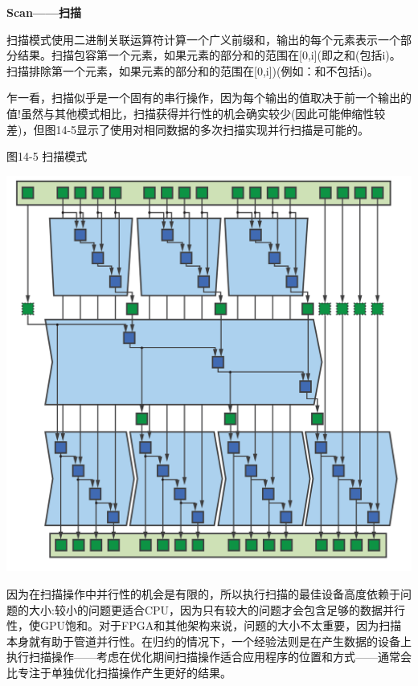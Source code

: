 \hspace*{\fill} \par %
\textbf{Scan——扫描}

扫描模式使用二进制关联运算符计算一个广义前缀和，输出的每个元素表示一个部分结果。扫描包容第一个元素，如果元素的部分和的范围在[0,i](即之和(包括i)。扫描排除第一个元素，如果元素的部分和的范围在[0,i])(例如：和不包括i)。\par

乍一看，扫描似乎是一个固有的串行操作，因为每个输出的值取决于前一个输出的值!虽然与其他模式相比，扫描获得并行性的机会确实较少(因此可能伸缩性较差)，但图14-5显示了使用对相同数据的多次扫描实现并行扫描是可能的。\par

\hspace*{\fill} \par %
图14-5 扫描模式
\begin{center}
	\includegraphics[width=1.\textwidth]{content/chapter-14/images/5}
\end{center}

因为在扫描操作中并行性的机会是有限的，所以执行扫描的最佳设备高度依赖于问题的大小:较小的问题更适合CPU，因为只有较大的问题才会包含足够的数据并行性，使GPU饱和。对于FPGA和其他架构来说，问题的大小不太重要，因为扫描本身就有助于管道并行性。在归约的情况下，一个经验法则是在产生数据的设备上执行扫描操作——考虑在优化期间扫描操作适合应用程序的位置和方式——通常会比专注于单独优化扫描操作产生更好的结果。\par

